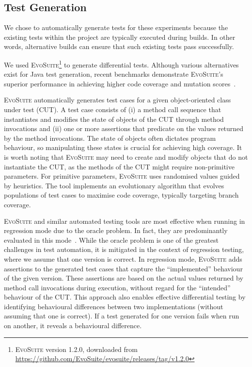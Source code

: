 \documentclass[conference]{IEEEtran}
\makeatletter
\newcommand{\evosuite}{\textsc{EvoSuite}\@\xspace}
\newcommand{\valerio}[1]{\textbf{\textcolor{blue}{[ \ding{46}Valerio: #1]}}}
\makeatother
\begin{document}
\subsection{Test Generation}

We chose to automatically generate tests for these experiments because the existing tests within the project are typically executed during builds. In other words, alternative builds can ensure that such existing tests pass successfully.

We used \evosuite\footnote{\evosuite version 1.2.0, downloaded from \url{https://github.com/EvoSuite/evosuite/releases/tag/v1.2.0}}
to generate differential tests. Although various alternatives exist for Java test generation, recent benchmarks demonstrate \evosuite's superior performance in achieving higher code coverage and mutation scores~\cite{jahangirova2023sbft}.

\evosuite automatically generates test cases for a given object-oriented class under test (CUT). A test case consists of (i) a method call sequence that instantiates and modifies the state of objects of the CUT through method invocations and (ii) one or more assertions that predicate on the values returned by the method invocations. The state of objects often dictates program behaviour, so manipulating these states is crucial for achieving high coverage. It is worth noting that \evosuite may need to create and modify objects that do not instantiate the CUT, as the methods of the CUT might require non-primitive parameters. For primitive parameters, \evosuite uses randomised values guided by heuristics. The tool implements an evolutionary algorithm that evolves populations of test cases to maximise code coverage, typically targeting branch coverage.

\evosuite and similar automated testing tools are most effective when running in regression mode due to the oracle problem. In fact, they are predominantly evaluated in this mode~\cite{jahangirova2023sbft,shamshiri2015automatically}. While the oracle problem is one of the greatest challenges in test automation, it is mitigated in the context of regression testing, where we assume that one version is correct. In regression mode, \evosuite adds assertions to the generated test cases that capture the ``implemented'' behaviour of the given version. These assertions are based on the actual values returned by method call invocations during execution, without regard for the ``intended'' behaviour of the CUT. This approach also enables effective differential testing by identifying behavioural differences between two implementations (without assuming that one is correct). If a test generated for one version fails when run on another, it reveals a behavioural difference. %
\end{document}
